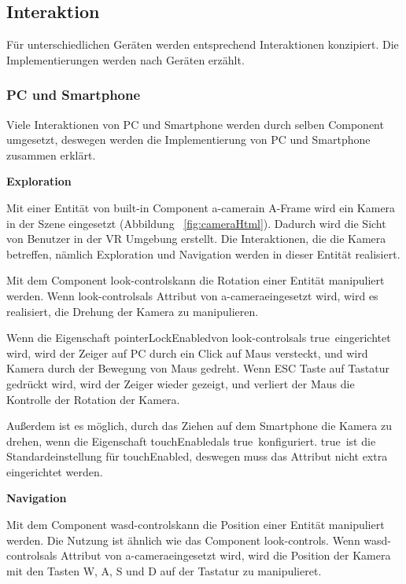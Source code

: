  \subsection{Interaktion}
  Für unterschiedlichen Geräten werden entsprechend Interaktionen konzipiert. Die Implementierungen werden nach Geräten erzählt.
  
  \subsubsection{PC und Smartphone}
  Viele Interaktionen von PC und Smartphone werden durch selben Component umgesetzt, deswegen werden die Implementierung von PC und Smartphone zusammen erklärt.
  
  \textbf{Exploration}
  
  Mit einer Entität von built-in Component \glqq a-camera\grqq in A-Frame wird ein Kamera in der Szene eingesetzt (Abbildung ~\ref{fig:cameraHtml}). Dadurch wird die Sicht von Benutzer in der VR Umgebung erstellt. Die Interaktionen, die die Kamera betreffen, nämlich Exploration und Navigation werden in dieser Entität realisiert.
  
  Mit dem Component \glqq look-controls\grqq kann die Rotation einer Entität manipuliert werden. Wenn \grqq look-controls\grqq als Attribut von \glqq a-camera\grqq eingesetzt wird, wird es realisiert, die Drehung der Kamera zu manipulieren.
  
  Wenn die Eigenschaft \glqq pointerLockEnabled\grqq von \glqq look-controls\grqq  als \glqq true\grqq\ eingerichtet wird, wird der Zeiger auf PC durch ein Click auf Maus versteckt, und wird Kamera durch der Bewegung von Maus gedreht. Wenn ESC Taste auf Tastatur gedrückt wird, wird der Zeiger wieder gezeigt, und verliert der Maus die Kontrolle der Rotation der Kamera.
  
  Außerdem ist es möglich, durch das Ziehen auf dem Smartphone die Kamera zu drehen, wenn die Eigenschaft \glqq touchEnabled\grqq als \glqq true\grqq\ konfiguriert. \glqq true\grqq\ ist die Standardeinstellung für \glqq touchEnabled\grqq, deswegen muss das Attribut nicht extra eingerichtet werden.
  
  \textbf{Navigation}
  
  Mit dem Component \glqq wasd-controls\grqq kann die Position einer Entität manipuliert werden. Die Nutzung ist ähnlich wie das Component \glqq look-controls\grqq. Wenn \grqq wasd-controls\grqq als Attribut von \glqq a-camera\grqq eingesetzt wird, wird die Position der Kamera mit den Tasten W, A, S und D auf der Tastatur zu manipulieret.
  
